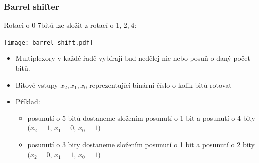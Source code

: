 \documentclass{beamer}
\begin{document}
\begin{frame}
\frametitle{Barrel shifter}

Rotaci o 0-7bitů lze složit z rotací o 1, 2, 4:
\begin{center}
   \texttt{[image: barrel-shift.pdf]}
\end{center}

\begin{itemize}
\item Multiplexory v každé řadě vybírají buď nedělej nic nebo posuň o daný počet bitů.
\item Bitové vstupy $x_2,x_1,x_0$ reprezentující binární číslo o kolik bitů rotovat
\item Příklad:
\begin{itemize}
\item posunutí o 5 bitů dostaneme složením posunutí o 1 bit a posunutí o 4 bity ($x_2=1$, $x_1=0$, $x_0=1$)
\item posunutí o 3 bity dostaneme složením posunutí o 1 bit a posunutí o 2 bity ($x_2=0$, $x_1=1$, $x_0=1$)
\end{itemize}
\end{itemize}

\end{frame}
\end{document}
